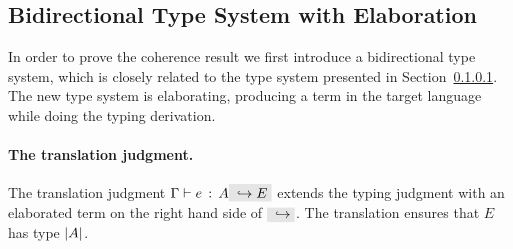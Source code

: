 %
%
%
%




\subsection{Bidirectional Type System with Elaboration}

In order to prove the coherence result we first introduce a bidirectional
type system, which is closely related to the type system presented in
Section~\ref{}. The new type system is elaborating, producing a term 
in the target language while doing the typing derivation.

\paragraph{The translation judgment.} The translation judgment $\jtype \Gamma e
A \yields E$ extends the typing judgment with an elaborated term on the right
hand side of $\yields {}$. The translation ensures that $E$ has type
$\lvert A \rvert$. 

